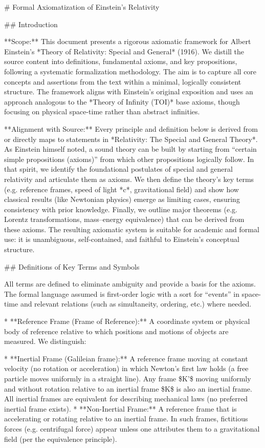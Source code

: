 \documentclass{article}
\begin{document}
# Formal Axiomatization of Einstein’s Relativity

## Introduction

**Scope:** This document presents a rigorous axiomatic framework for Albert Einstein’s *Theory of Relativity: Special and General* (1916). We distill the source content into definitions, fundamental axioms, and key propositions, following a systematic formalization methodology. The aim is to capture all core concepts and assertions from the text within a minimal, logically consistent structure. The framework aligns with Einstein’s original exposition and uses an approach analogous to the *Theory of Infinity (TOI)* base axioms, though focusing on physical space-time rather than abstract infinities.

**Alignment with Source:** Every principle and definition below is derived from or directly maps to statements in *Relativity: The Special and General Theory*. As Einstein himself noted, a sound theory can be built by starting from “certain simple propositions (axioms)” from which other propositions logically follow. In that spirit, we identify the foundational postulates of special and general relativity and articulate them as axioms. We then define the theory’s key terms (e.g. reference frames, speed of light *c*, gravitational field) and show how classical results (like Newtonian physics) emerge as limiting cases, ensuring consistency with prior knowledge. Finally, we outline major theorems (e.g. Lorentz transformations, mass–energy equivalence) that can be derived from these axioms. The resulting axiomatic system is suitable for academic and formal use: it is unambiguous, self-contained, and faithful to Einstein’s conceptual structure.

## Definitions of Key Terms and Symbols

All terms are defined to eliminate ambiguity and provide a basis for the axioms. The formal language assumed is first-order logic with a sort for “events” in space-time and relevant relations (such as simultaneity, ordering, etc.) where needed.

* **Reference Frame (Frame of Reference):** A coordinate system or physical body of reference relative to which positions and motions of objects are measured. We distinguish:

  * **Inertial Frame (Galileian frame):** A reference frame moving at constant velocity (no rotation or acceleration) in which Newton’s first law holds (a free particle moves uniformly in a straight line). Any frame \$K'\$ moving uniformly and without rotation relative to an inertial frame \$K\$ is also an inertial frame. All inertial frames are equivalent for describing mechanical laws (no preferred inertial frame exists).
  * **Non-Inertial Frame:** A reference frame that is accelerating or rotating relative to an inertial frame. In such frames, fictitious forces (e.g. centrifugal force) appear unless one attributes them to a gravitational field (per the equivalence principle).
\end{document}
